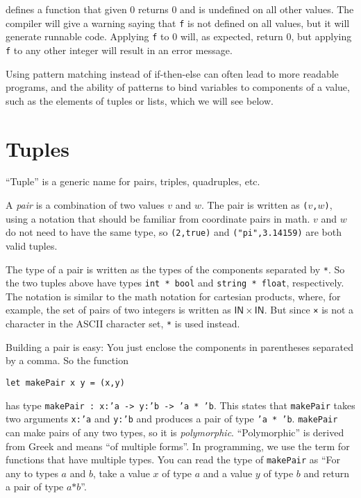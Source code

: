 \documentclass[a4paper]{article}
\begin{document}
\noindent
defines a function that given 0 returns 0 and is undefined on all
other values.  The compiler will give a warning saying that \texttt{f}
is not defined on all values, but it will generate runnable code.
Applying \texttt{f} to 0 will, as expected, return 0, but applying
\texttt{f} to any other integer will result in an error message.

Using pattern matching instead of if-then-else can often lead to more
readable programs, and the ability of patterns to bind variables to
components of a value, such as the elements of tuples or lists, which
we will see below.

\section{Tuples}

``Tuple'' is a generic name for pairs, triples, quadruples, etc.

A \emph{pair} is a combination of two values $v$ and $w$.  The pair is
written as \texttt{($v$,$w$)}, using a notation that should be familiar
from coordinate pairs in math.  $v$ and $w$ do not need to have the
same type, so \texttt{(2,true)} and \texttt{("pi",3.14159)} are both
valid tuples.

The type of a pair is written as the types of the components separated
by \texttt{*}.  So the two tuples above have types \texttt{int~*~bool}
and \texttt{string~*~float}, respectively.  The notation is similar to
the math notation for cartesian products, where, for example, the set
of pairs of two integers is written as $\mathsf{I\!\!N} \times
\mathsf{I\!\!N}$.  But since \texttt{×} is not a character in the
ASCII character set, \texttt{*} is used instead.

Building a pair is easy: You just enclose the components in
parentheses separated by a comma.  So the function

\begin{verbatim}
let makePair x y = (x,y)
\end{verbatim}

\noindent
has type \texttt{makePair : x:'a -> y:'b -> 'a * 'b}.  This states
that \texttt{makePair} takes two arguments \texttt{x:'a} and
\texttt{y:'b} and produces a pair of type \texttt{'a * 'b}.
\texttt{makePair} can make pairs of any two types, so it is
\emph{polymorphic}.  ``Polymorphic'' is derived from Greek and means
``of multiple forms''.  In programming, we use the term for functions
that have multiple types.  You can read the type of \texttt{makePair}
as ``For any to types $a$ and $b$, take a value $x$ of type $a$ and a
value $y$ of type $b$ and return a pair of type $a\texttt{*}b$''.
\end{document}
